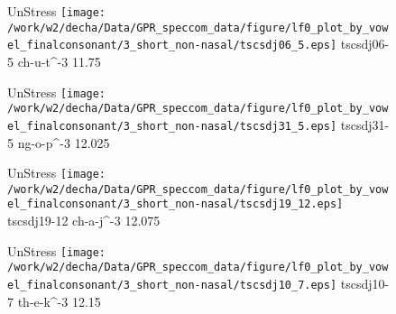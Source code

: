 \documentclass{article}
\begin{document}
\begin{figure}[t]
\begin{minipage}[b]{.24\textwidth}
UnStress
\centering
\texttt{[image: /work/w2/decha/Data/GPR\_speccom\_data/figure/lf0\_plot\_by\_vowel\_finalconsonant/3\_short\_non-nasal/tscsdj06\_5.eps]}
tscsdj06-5 ch-u-t\textasciicircum-3 11.75
\end{minipage}
\begin{minipage}[b]{.24\textwidth}
UnStress
\centering
\texttt{[image: /work/w2/decha/Data/GPR\_speccom\_data/figure/lf0\_plot\_by\_vowel\_finalconsonant/3\_short\_non-nasal/tscsdj31\_5.eps]}
tscsdj31-5 ng-o-p\textasciicircum-3 12.025
\end{minipage}
\begin{minipage}[b]{.24\textwidth}
UnStress
\centering
\texttt{[image: /work/w2/decha/Data/GPR\_speccom\_data/figure/lf0\_plot\_by\_vowel\_finalconsonant/3\_short\_non-nasal/tscsdj19\_12.eps]}
tscsdj19-12 ch-a-j\textasciicircum-3 12.075
\end{minipage}
\begin{minipage}[b]{.24\textwidth}
UnStress
\centering
\texttt{[image: /work/w2/decha/Data/GPR\_speccom\_data/figure/lf0\_plot\_by\_vowel\_finalconsonant/3\_short\_non-nasal/tscsdj10\_7.eps]}
tscsdj10-7 th-e-k\textasciicircum-3 12.15
\end{minipage}
\end{figure}
\end{document}
